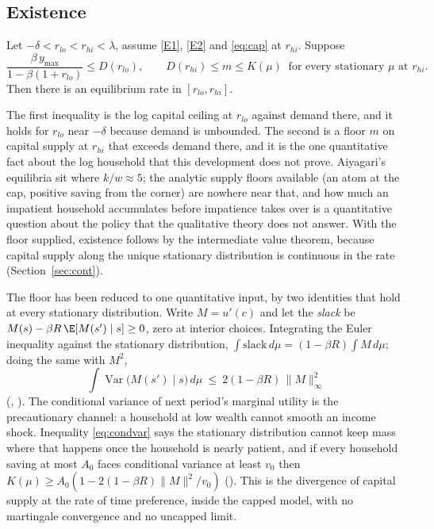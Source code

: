 \subsection{Existence}\label{sec:exist}

\begin{theorem}\label{thm:exist}
Let $-\delta<r_{lo}<r_{hi}<\lambda$, assume \ref{E1}, \ref{E2} and \eqref{eq:cap} at $r_{hi}$.
Suppose
\[
  \frac{\beta\,y_{\max}}{1-\beta(1+r_{lo})}\le D(r_{lo}),\qquad
  D(r_{hi})\le m\le K(\mu)\ \text{ for every stationary }\mu\text{ at }r_{hi}.
\]
Then there is an equilibrium rate in $[r_{lo},r_{hi}]$.
\end{theorem}

The first inequality is the log capital ceiling at $r_{lo}$ against demand there, and it holds
for $r_{lo}$ near $-\delta$ because demand is unbounded. The second is a floor $m$ on capital
supply at $r_{hi}$ that exceeds demand there, and it is the one quantitative fact about the log
household that this development does not prove. Aiyagari's equilibria sit where $k/w\approx5$; the
analytic supply floors available (an atom at the cap, positive saving from the corner) are nowhere
near that, and how much an impatient household accumulates before impatience takes over is a
quantitative question about the policy that the qualitative theory does not answer. With the floor
supplied, existence follows by the intermediate value theorem, because capital supply along the
unique stationary distribution is continuous in the rate (Section~\ref{sec:cont}).

The floor has been reduced to one quantitative input, by two identities that hold at every
stationary distribution. Write $M=u'(c)$ and let the \emph{slack} be
$M(s)-\beta R\,\E[M(s')\mid s]\ge0$, zero at interior choices. Integrating the Euler inequality
against the stationary distribution, $\int \mathrm{slack}\,d\mu=(1-\beta R)\int M\,d\mu$; doing the
same with $M^2$,
\begin{equation}\label{eq:condvar}
  \int \operatorname{Var}\bigl(M(s')\mid s\bigr)\,d\mu\ \le\ 2(1-\beta R)\,\|M\|_\infty^2
\end{equation}
(, ). The conditional variance of next
period's marginal utility is the precautionary channel: a household at low wealth cannot smooth an
income shock. Inequality \eqref{eq:condvar} says the stationary distribution cannot keep mass
where that happens once the household is nearly patient, and if every household saving at most
$A_0$ faces conditional variance at least $v_0$ then $K(\mu)\ge A_0(1-2(1-\beta R)\|M\|^2/v_0)$
(). This is the divergence of capital supply at the rate
of time preference, inside the capped model, with no martingale convergence and no uncapped
limit.

